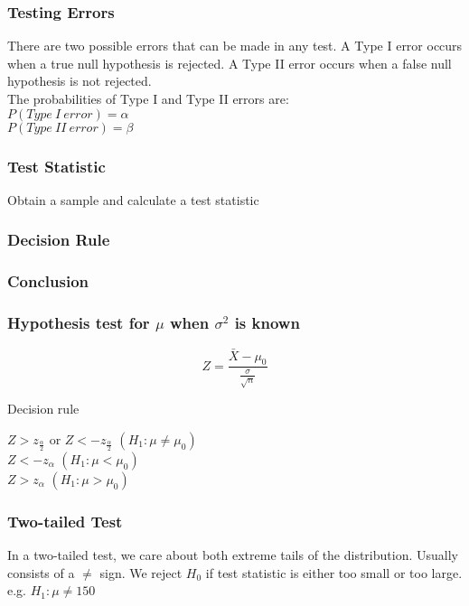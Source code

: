 \documentclass{article}
\begin{document}
\subsubsection{Testing Errors}
There are two possible errors that can be made in any test. A Type I error occurs when a true null hypothesis is rejected.
A Type II error occurs when a false null hypothesis is not rejected.\\

The probabilities of Type I and Type II errors are:\\

$P(Type\:I\:error) = \alpha$\\

$P(Type\:II\:error) = \beta$

\subsubsection{Test Statistic}
Obtain a sample and calculate a test statistic

\subsubsection{Decision Rule}

\subsubsection{Conclusion}

\subsubsection{Hypothesis test for $\mu$ when $\sigma^2$ is known}

$$
Z = \frac{\bar{X} - \mu_0}{\frac{\sigma}{\sqrt{n}}}
$$

Decision rule

$Z > z_{\frac{\alpha}{2}}$ or $Z < -z_{\frac{\alpha}{2}}$ $(H_1 : \mu \neq \mu_0)$
\\

$Z < -z_{\alpha}$ $(H_1 : \mu < \mu_0)$
\\

$Z > z_{\alpha}$ $(H_1 : \mu > \mu_0)$



\subsubsection{Two-tailed Test}
In a two-tailed test, we care about both extreme tails of the distribution. Usually consists of a $\neq$ sign. We reject $H_0$ if test statistic is either too small or too large.
e.g. $ H_1 : \mu \neq 150$
\end{document}

